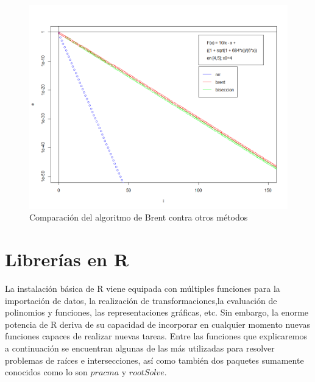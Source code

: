 \documentclass[a4paper,12pt]{article}
\begin{document}
\vspace{-1em}
\begin{figure}[ht!]
\centering
\includegraphics[scale=0.6]{img/nrr_vs_metodos.png}
\vspace{-1em}
\caption{Comparación del algoritmo de Brent contra otros métodos}
\label{fig:nrr_vs_metodos}
\end{figure}

\newpage


\section{Librerías en R}

La instalación básica de R viene equipada con múltiples funciones para la importación de datos, la realización de transformaciones,la evaluación de polinomios y funciones, las representaciones gráficas, etc. Sin embargo, la enorme potencia de R deriva de su capacidad de incorporar en cualquier momento nuevas funciones capaces de realizar nuevas tareas.
Entre las funciones que explicaremos a continuación se encuentran algunas de las más utilizadas para resolver problemas de raíces e intersecciones, así como también dos paquetes sumamente conocidos como lo son $pracma$ y $rootSolve$. \cite{noauthor_r_nodate} \par
\end{document}

